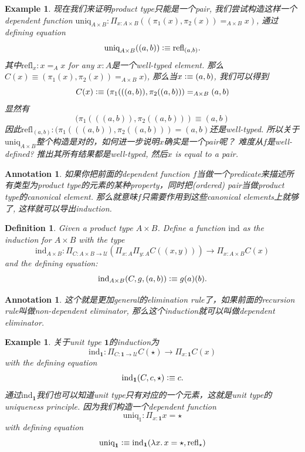 \documentclass{article}
\newtheorem{example}[theorem]{Example}
\newtheorem{definition}[theorem]{Definition}
\newtheorem{annotation}[theorem]{Annotation}
\newcommand{\lam}[2]{\ensuremath{\lambda #1\ldotp #2}} %
\newcommand{\defeqv}{\vcentcolon\equiv}
\begin{document}
\begin{example}
\rm 现在我们来证明product type只能是一个pair, 我们尝试构造这样一个dependent function $\text{uniq}_{A \times B}:\Pi_{x:A \times B}((\pi_1(x),\pi_2(x)) =_{A \times B} x)$, 通过defining equation
\[
	\text{uniq}_{A \times B}((a,b)) \defeqv \text{refl}_{(a,b)}.
\]
其中$\text{refl}_{x}: x =_A x$ for any $x:A$是一个well-typed element. 那么$C(x) \equiv (\pi_1(x),\pi_2(x)) =_{A \times B} x)$, 那么当$x \defeqv (a,b)$, 我们可以得到
\[
	C(x) \defeqv (\pi_1(((a,b)),\pi_2((a,b))) =_{A \times B} (a,b)
\]
显然有
\[
	(\pi_1(((a,b)),\pi_2((a,b))) \equiv (a,b)
\]
因此$\text{refl}_{(a,b)}: (\pi_1(((a,b)),\pi_2((a,b))) = (a,b)$还是well-typed. 所以关于$\text{uniq}_{A \times B}$整个构造是对的，如何进一步说明$x$确实是一个pair呢？ 难度从$f$是well-defined? 推出其所有结果都是well-typed, 然后$x$ is equal to a pair.
\end{example}


\begin{annotation}
\rm 如果你把前面的dependent function $f$当做一个predicate来描述所有类型为product type的元素的某种property，同时把(ordered) pair当做product type的canonical element. 那么就意味$f$只需要作用到这些canonical elements上就够了, 这样就可以导出induction.
\end{annotation}

\begin{definition}
\rm Given a product type $A \times B$. Define a function $\text{ind}$ as the induction for $A \times B$ with the type
\[
	\text{ind}_{A \times B}: {\Pi}_{C:A \times B \to \mathcal{U}}(\Pi_{x:A}\Pi_{y:A} C((x,y))) \to \Pi_{x:A\times B} C(x)
\]
and the defining equation:
\[
	\text{ind}_{A \times B}(C, g, (a,b)) \defeqv g(a)(b).
\]
\end{definition}

\begin{annotation}
\rm 这个就是更加general的elimination rule了，如果前面的recursion rule叫做non-dependent eliminator, 那么这个induction就可以叫做dependent eliminator.
\end{annotation}

\begin{example}
\rm 关于unit type $\mathbf{1}$的induction为
\[
    \text{ind}_\mathbf{1}: \Pi_{C:\mathbf{1} \to \mathcal{U}} C(\star) \to \Pi_{x:\mathbf{1}} C(x)
\]
with the defining equation
\[
    \text{ind}_\mathbf{1}(C,c,\star) \defeqv c.
\]
通过$\text{ind}_\mathbf{1}$我们也可以知道unit type只有对应的一个元素，这就是unit type的uniqueness principle. 因为我们构造一个dependent function
\[
    \text{uniq}_1:\Pi_{x:\mathbf{1}} x=\star
\]
with defining equation
\[
    \text{uniq}_\mathbf{1} \defeqv \text{ind}_\mathbf{1}(\lam{x}{x = \star}, \text{refl}_\star)
\]
\end{example}
\end{document}
